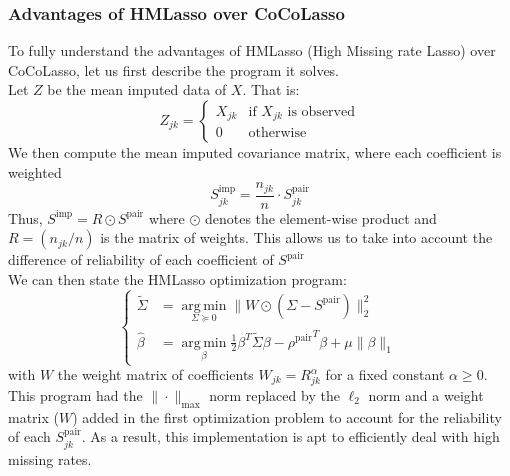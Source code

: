 \documentclass[]{article}
\DeclareMathOperator*{\argmin}{arg\,min}
\begin{document}
\subsubsection{Advantages of HMLasso over CoCoLasso}
To fully understand the advantages of HMLasso (High Missing rate Lasso) over CoCoLasso, let us first describe the program it solves.\\
Let $Z$ be the mean imputed data of $X$. That is:
\begin{equation}
	Z_{jk} = \left\{
	\begin{array}{ll}
		X_{jk} & \mbox{if $X_{jk}$ is observed}\\
		0 & \mbox{otherwise}
	\end{array}\right.
\end{equation}
We then compute the mean imputed covariance matrix, where each coefficient is weighted 
\begin{equation}
	S^{\text{imp}}_{jk} = \frac{n_{jk}}{n}\cdot S^{\text{pair}}_{jk}
\end{equation}
Thus, $S^{\text{imp}} = R \odot S^{\text{pair}}$ where $\odot$ denotes the element-wise product and $R = (n_{jk}/n)$ is the matrix of weights. This allows us to take into account the difference of reliability of each coefficient of $S^{\text{pair}}$\\
We can then state the HMLasso optimization program:
\begin{equation}
	\label{HMLassoProgram}
	\left\{
	\begin{array}{ll}
		\tilde{\Sigma} &= \argmin\limits_{\Sigma \succeq 0} \|W\odot(\Sigma - S^{\text{pair}})\|_2^2\\
		\hat{\beta} &= \argmin\limits_{\beta} \frac{1}{2}\beta^T \tilde{\Sigma}\beta - {\rho^{\text{pair}}}^T\beta + \mu \|\beta\|_1
	\end{array}\right.
\end{equation}
with $W$ the weight matrix of coefficients $W_{jk} = R_{jk}^{\alpha}$ for a fixed constant $\alpha \geq 0$.\\

This program had the $\|\cdot \|_{\text{max}}$ norm replaced by the $\ell_2$ norm and a weight matrix ($W$) added in the first optimization problem to account for the reliability of each $S^{\text{pair}}_{jk}$. As a result, this implementation is apt to efficiently deal with high missing rates.
\end{document}

